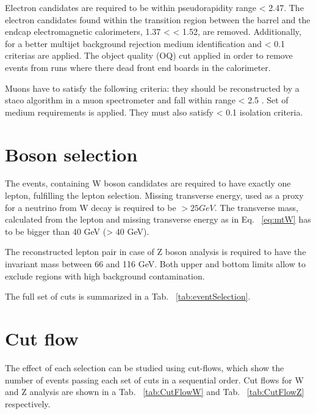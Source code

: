 Electron candidates are required to be within pseudorapidity range \etall < 2.47. The electron candidates found within the transition region between the barrel and the endcap electromagnetic calorimeters, 1.37 < \etall < 1.52, are removed.  Additionally, for a better multijet background rejection  medium identification and \ptcone < 0.1 criterias are applied. The object quality (OQ) cut applied in order to remove events from runs where there dead front end boards in the calorimeter. 

Muons have to satisfy the following criteria: they should be reconstructed by a staco algorithm in a muon spectrometer and fall within range \etall < 2.5 . Set of medium requirements is applied. They must also satisfy \ptcone < 0.1 isolation criteria.

\section{Boson selection}
The events, containing W boson candidates are required to have exactly one lepton, fulfilling the lepton selection. Missing transverse energy, used as a proxy for a neutrino from W decay is required to be \etmiss $>25 GeV$.  The transverse mass, calculated from the lepton and missing transverse energy as in Eq. ~\ref{eq:mtW} has to be bigger than 40 GeV (\mtw > 40 GeV). 

The reconstructed lepton pair in case of Z boson analysis is required to have the invariant mass between 66 and 116 GeV. Both upper and bottom limits allow to exclude regions with high background contamination. 

The full set of cuts is summarized in a Tab. ~\ref{tab:eventSelection}.

\section{Cut flow}

The effect of each selection can be studied using cut-flows, which show the number of events passing each set of cuts in a sequential order. Cut flows for W and Z analysis are shown in a Tab. ~\ref{tab:CutFlowW} and Tab. ~\ref{tab:CutFlowZ} respectively.



